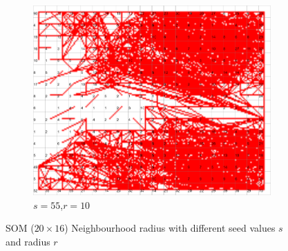 \documentclass{acm_proc_article-sp}
\begin{document}
\begin{figure}
\begin{subfigure}[b]{0.30\linewidth}
        \label{fig:wine-newmid-radius-neighbourhood-graph--r-10-seed-7}
    \end{subfigure}
    \begin{subfigure}[b]{0.30\linewidth}
        \includegraphics[width=\linewidth]{img/wine-newmid-radius-neighbourhood-graph--r-10-seed-55}
        \caption{$s=55$,$r=10$}
        \label{fig:wine-newmid-radius-neighbourhood-graph--r-10-seed-55}
    \end{subfigure}
    \caption{SOM ($20\times16$) Neighbourhood radius with different seed values $s$ and radius $r$}
    \label{fig:wine-newmid-radius-neighbourhood-graph--r-10-seed}
\end{figure}
\end{document}
